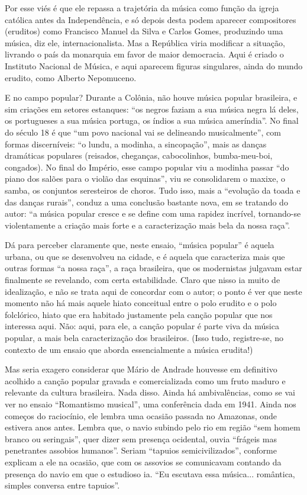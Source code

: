 Por esse viés é que ele repassa a trajetória da música como função da
igreja católica antes da Independência, e só depois desta podem aparecer
compositores (eruditos) como Francisco Manuel da Silva e Carlos Gomes,
produzindo uma música, diz ele, internacionalista. Mas a República viria
modificar a situação, livrando o país da monarquia em favor de maior
democracia. Aqui é criado o Instituto Nacional de Música, e aqui
aparecem figuras singulares, ainda do mundo erudito, como Alberto
Nepomuceno.

E no campo popular? Durante a Colônia, não houve música popular
brasileira, e sim criações em setores estanques: ``os negros faziam a
sua música negra lá deles, os portugueses a sua música portuga, os
índios a sua música ameríndia''. No final do século 18 é que ``um povo
nacional vai se delineando musicalmente'', com formas discerníveis: ``o
lundu, a modinha, a sincopação'', mais as danças dramáticas populares
(reisados, cheganças, cabocolinhos, bumba-meu-boi, congados). No final
do Império, esse campo popular viu a modinha passar ``do piano dos
salões para o violão das esquinas'', viu se consolidarem o maxixe, o
samba, os conjuntos seresteiros de choros. Tudo isso, mais a ``evolução
da toada e das danças rurais'', conduz a uma conclusão bastante nova, em
se tratando do autor: ``a música popular cresce e se define com uma
rapidez incrível, tornando-se violentamente a criação mais forte e a
caracterização mais bela da nossa raça''.

Dá para perceber claramente que, neste ensaio, ``música popular'' é
aquela urbana, ou que se desenvolveu na cidade, e é aquela que
caracteriza mais que outras formas ``a nossa raça'', a raça brasileira,
que os modernistas julgavam estar finalmente se revelando, com certa
estabilidade. Claro que nisso ia muito de idealização, e não se trata
aqui de concordar com o autor; o ponto é ver que neste momento não há
mais aquele hiato conceitual entre o polo erudito e o polo folclórico,
hiato que era habitado justamente pela canção popular que nos interessa
aqui. Não: aqui, para ele, a canção popular é parte viva da música
popular, a mais bela caracterização dos brasileiros. (Isso tudo,
registre-se, no contexto de um ensaio que aborda essencialmente a música
erudita!)

Mas seria exagero considerar que Mário de Andrade houvesse em definitivo
acolhido a canção popular gravada e comercializada como um fruto maduro
e relevante da cultura brasileira. Nada disso. Ainda há ambivalências,
como se vai ver no ensaio ``Romantismo musical'', uma conferência dada
em 1941. Ainda nos começos do raciocínio, ele lembra uma ocasião passada
no Amazonas, onde estivera anos antes. Lembra que, o navio subindo pelo
rio em região ``sem homem branco ou seringais'', quer dizer sem presença
ocidental, ouvia ``frágeis mas penetrantes assobios humanos''. Seriam
``tapuios semicivilizados'', conforme explicam a ele na ocasião, que com
os assovios se comunicavam contando da presença do navio em que o
estudioso ia. ``Eu escutava essa música... romântica, simples conversa
entre tapuios''.

